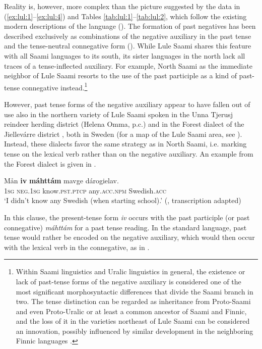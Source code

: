 \documentclass[output=paper,colorlinks,citecolor=brown]{langscibook}
\begin{document}
Reality is, however, more complex than the picture suggested by the data in (\ref{ex:lul:1}–\ref{ex:lul:4}) and Tables \ref{tab:lul:1}–\ref{tab:lul:2}, which follow the existing modern descriptions of the language (\citealt{Spiik1989,NystøJohnsen2011}).
The formation of past negatives has been described exclusively as combinations of the negative auxiliary in the past tense and the tense-neutral connegative form (). While Lule Saami shares this feature with all Saami languages to its south, its sister languages in the north lack all traces of a tense-inflected auxiliary. For example, North Saami as the immediate neighbor of Lule Saami resorts to the use of the past participle as a kind of past-tense connegative instead.\footnote{Within Saami linguistics and Uralic linguistics in general, the existence or lack of past-tense forms of the negative auxiliary is considered one of the most significant morphosyntactic differences that divide the Saami branch in two. The tense distinction can be regarded as inheritance from Proto-Saami and even Proto-Uralic or at least a common ancestor of Saami and Finnic, and the loss of it in the varieties northeast of Lule Saami can be considered an innovation, possibly influenced by similar development in the neighboring Finnic languages \citep[76–77, 80, 224–225]{Sammallahti1998}.}

However, past tense forms of the negative auxiliary appear to have fallen out of use also in the northern variety of Lule Saami spoken in the Unna Tjerusj reindeer herding district (Helena Omma, p.c.) and in the Forest dialect of the Jiellevárre district \citep{KejonenFC}, both in Sweden (for a map of the Lule Saami area, see \citealt[131]{Ylikoski2022}). Instead, these dialects favor the same strategy as in North Saami, i.e. marking tense on the lexical verb rather than on the negative auxiliary. An example from the Forest dialect is given in .

\ea\label{ex:lul:5} 
    \gll Mån \textbf{iv} \textbf{máhttám} mavge dárogielav. \\ 
         \textsc{1sg} \textsc{neg.1sg} know.\textsc{pst.ptcp} any\textsc{.acc.npm} Swedish.\textsc{acc} \\
    \glt ‘I didn’t know any Swedish (when starting school).’ (\citealt{KejonenFC}, transcription adapted) 
\z 

In this clause, the present-tense form \textit{iv} occurs with the past participle (or past connegative) \textit{máhttám} for a past tense reading. In the standard language, past tense would rather be encoded on the negative auxiliary, which would then occur with the lexical verb in the connegative, as in .
\end{document}
